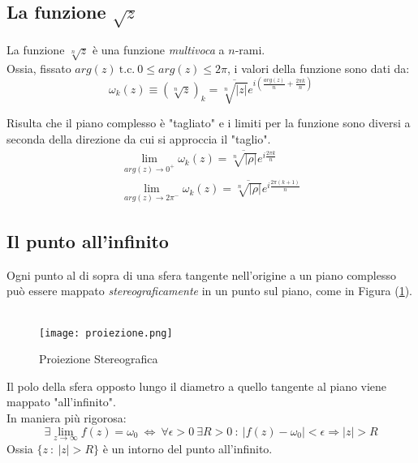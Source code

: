 \documentclass[twoside]{article}
\begin{document}
\subsection{La funzione \texorpdfstring{$\sqrt{z}$}{Lg}}

La funzione $\sqrt[n]{z}$ è una funzione \textit{multivoca} a $n$-rami.
\\
Ossia, fissato $arg(z) \ \text{t.c.} \ 0\leq arg(z) \leq 2\pi$, i valori della funzione sono dati da:
\begin{equation}
    \omega_k(z)\equiv (\sqrt[n]{z})_k = \overline{\sqrt[n]{|z|}} e^{i(\frac{arg(z)}{n}+\frac{2\pi k}{n})}
\end{equation}

Risulta che il piano complesso è "tagliato" e i limiti per la funzione sono diversi a seconda della direzione da cui si approccia il "taglio".
\begin{equation}
    \begin{split}
        \lim_{arg(z) \to 0^+} \omega_k(z)=\overline{\sqrt[n]{|\rho|}}e^{i\frac{2\pi k}{n}} \\
        \lim_{arg(z) \to 2\pi^-} \omega_k(z)=\overline{\sqrt[n]{|\rho|}}e^{i\frac{2\pi (k+1)}{n}}
    \end{split}
\end{equation}

\vspace{3cm}

\subsection{Il punto all'infinito}

Ogni punto al di sopra di una sfera tangente nell'origine a un piano complesso può essere mappato \textit{stereograficamente} in un punto sul piano, come in Figura (\ref{fig:proiezione}).
\\ \\
\begin{figure}[ht]
\centering
\texttt{[image: proiezione.png]}
\label{fig:proiezione}
\caption{Proiezione Stereografica}
\end{figure}

Il polo della sfera opposto lungo il diametro a quello tangente al piano viene mappato "all'infinito".
\\
In maniera più rigorosa:
\begin{equation}
    \exists \lim_{z \to \infty}f(z)=\omega_0 \ \iff \ \forall \epsilon >0 \ \exists R>0 \ : \ |f(z)-\omega_0|<\epsilon \Rightarrow |z|>R
\end{equation}
Ossia $\{z \ : \ |z|>R \}$ è un intorno del punto all'infinito.
\end{document}
